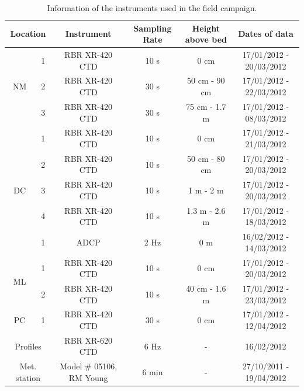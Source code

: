 \documentclass[tesis.tex]{subfiles}
\begin{document}
\begin{table}[h!]
    \centering
    \caption{Information of the instruments used in the field campaign.}
    \begin{tabular}{|cc|c|c|c|c|}
    \hline
    \multicolumn{2}{|c|}{Location}                & Instrument & Sampling Rate & Height above bed & Dates of data           \\ \hline
    \multicolumn{1}{|c|}{\multirow{3}{*}{NM}} & 1 & RBR XR-420 CTD    & 10 s          & 0 cm             & 17/01/2012 - 20/03/2012 \\ \cline{2-6} 
    \multicolumn{1}{|c|}{}                    & 2 & RBR XR-420 CTD    & 30 s          & 50 cm - 90 cm    & 17/01/2012 - 22/03/2012 \\ \cline{2-6} 
    \multicolumn{1}{|c|}{}                    & 3 & RBR XR-420 CTD    & 30 s          & 75 cm -  1.7 m   & 17/01/2012 - 08/03/2012 \\ \hline
    \multicolumn{1}{|c|}{\multirow{5}{*}{DC}} & 1 & RBR XR-420 CTD    & 10 s          & 0 cm             & 17/01/2012 - 21/03/2012 \\ \cline{2-6} 
    \multicolumn{1}{|c|}{}                    & 2 & RBR XR-420 CTD    & 10 s          & 50 cm - 80 cm    & 17/01/2012 - 20/03/2012 \\ \cline{2-6} 
    \multicolumn{1}{|c|}{}                    & 3 & RBR XR-420 CTD    & 10 s          & 1 m - 2 m        & 17/01/2012 - 20/03/2012 \\ \cline{2-6} 
    \multicolumn{1}{|c|}{}                    & 4 & RBR XR-420 CTD    & 10 s          & 1.3 m - 2.6 m    & 17/01/2012 - 18/03/2012 \\ \cline{2-6} 
    \multicolumn{1}{|c|}{} & \multicolumn{1}{c|}{1} & \multicolumn{1}{c|}{ADCP} & 2 Hz & \multicolumn{1}{c|}{0 m} & \multicolumn{1}{c|}{16/02/2012 - 14/03/2012} \\ \hline
    \multicolumn{1}{|c|}{\multirow{2}{*}{ML}} & 1 & RBR XR-420 CTD    & 10 s          & 0 cm             & 17/01/2012 - 20/03/2012 \\ \cline{2-6} 
    \multicolumn{1}{|c|}{}                    & 2 & RBR XR-420 CTD    & 10 s          & 40 cm - 1.6 m    & 17/01/2012 - 23/03/2012 \\ \hline
    \multicolumn{1}{|c|}{PC}                  & 1 & RBR XR-420 CTD    & 30 s          & 0 cm             & 17/01/2012 - 12/04/2012 \\ \hline
    \multicolumn{2}{|c|}{Profiles}               & RBR XR-620 CTD    & 6 Hz          & -                & 16/02/2012              \\ \hline
    \multicolumn{2}{|c|}{Met. station}               & Model \# 05106, RM Young    & 6 min          & -                & 27/10/2011 - 19/04/2012  \\ \hline
    \end{tabular}
    \label{tab:instr}
    \end{table}
\end{document}

